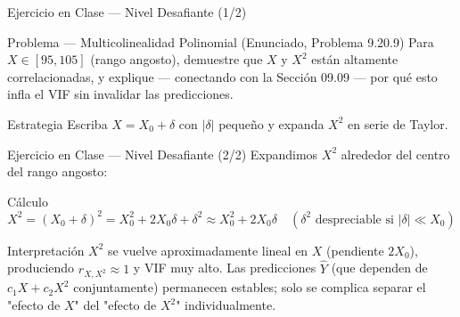 \documentclass[10pt, aspectratio=169]{beamer}
\begin{document}
\begin{frame}{Ejercicio en Clase --- Nivel Desafiante (1/2)}
  \footnotesize
  \begin{block}{Problema --- Multicolinealidad Polinomial (Enunciado, Problema 9.20.9)}
    Para $X\in[95,105]$ (rango angosto), demuestre que $X$ y $X^2$ están altamente correlacionadas, y explique --- conectando con la Sección 09.09 --- por qué esto infla el VIF sin invalidar las predicciones.
  \end{block}

  \vspace{0.1cm}
  \pause
  \begin{alertblock}{Estrategia}
    Escriba $X=X_0+\delta$ con $|\delta|$ pequeño y expanda $X^2$ en serie de Taylor.
  \end{alertblock}
\end{frame}

\begin{frame}{Ejercicio en Clase --- Nivel Desafiante (2/2)}
  \scriptsize
  Expandimos $X^2$ alrededor del centro del rango angosto: \pause

  \vspace{0.05cm}
  \begin{block}{Cálculo}
    \scriptsize
    $$X^2=(X_0+\delta)^2=X_0^2+2X_0\delta+\delta^2\approx X_0^2+2X_0\delta \quad (\delta^2 \text{ despreciable si } |\delta|\ll X_0)$$
  \end{block}

  \vspace{0.05cm}
  \pause
  \begin{alertblock}{Interpretación}
    $X^2$ se vuelve aproximadamente lineal en $X$ (pendiente $2X_0$), produciendo $r_{X,X^2}\approx1$ y VIF muy alto. Las predicciones $\hat Y$ (que dependen de $c_1X+c_2X^2$ conjuntamente) permanecen estables; solo se complica separar el "efecto de $X$" del "efecto de $X^2$" individualmente.
  \end{alertblock}
\end{frame}
\end{document}
